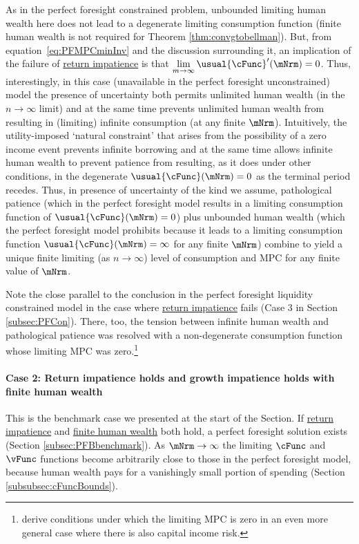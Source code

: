 \documentclass[\econtexRoot/BufferStockTheory]{subfiles}
\begin{document}
As in the perfect foresight constrained problem, unbounded limiting human wealth here does not lead to a degenerate limiting consumption function (finite human wealth is not required for Theorem \ref{thm:convgtobellman}).
But, from equation~\eqref{eq:PFMPCminInv} and the discussion surrounding it, an implication of the failure of \hyperlink{RIC}{return impatience} is that $\lim\limits_{m \rightarrow \infty} \usual{\cFunc}^{\prime}(\mNrm) = 0$.
Thus, interestingly, in this case (unavailable in the perfect foresight unconstrained) model the presence of uncertainty both permits unlimited human wealth (in the $n\rightarrow\infty$ limit) and at the same time prevents unlimited human wealth from resulting in (limiting) infinite consumption (at any finite $\mNrm$).
Intuitively, the utility-imposed `natural constraint' that arises from the possibility of a zero income event prevents infinite borrowing and at the same time allows infinite human wealth to prevent patience from resulting, as it does under other conditions, in the degenerate $\usual{\cFunc}(\mNrm)=0$ as the terminal period recedes.
Thus, in presence of uncertainty of the kind we assume, pathological patience (which in the perfect foresight model results in a limiting consumption function of $\usual{\cFunc}(\mNrm)=0$) plus unbounded human wealth (which the perfect foresight model prohibits because it leads to a limiting consumption function $\usual{\cFunc}(\mNrm)=\infty$ for any finite $\mNrm$) combine to yield a unique finite limiting (as $n \rightarrow \infty$) level of consumption and MPC for any finite value of $\mNrm$.


Note the close parallel to the conclusion in the perfect foresight liquidity constrained model in the case where \hyperlink{RIC}{return impatience} fails (Case 3 in Section \ref{subsec:PFCon}).
There, too, the tension between infinite human wealth and pathological patience was resolved with a non-degenerate consumption function whose limiting MPC was zero.\footnote{\cite{maTodaRich} derive conditions under which the limiting MPC is zero in an even more general case where there is also capital income risk.}

\hypertarget{When-the-RIC-Holds}{}
\paragraph{Case 2: Return impatience holds and growth impatience holds with finite human wealth}\label{subsubsec:WhenTheRICHolds}
This is the benchmark case we presented at the start of the Section.
If \hyperlink{RIC}{return impatience}  and \hyperlink{FHWC}{finite human wealth} both hold, a perfect foresight solution exists (Section \ref{subsec:PFBbenchmark}).
As $\mNrm \rightarrow \infty$ the limiting $\cFunc$ and $\vFunc$ functions become arbitrarily close to those in the perfect foresight model, because human wealth pays for a vanishingly small portion of spending (Section \ref{subsubsec:cFuncBounds}).
\end{document}
